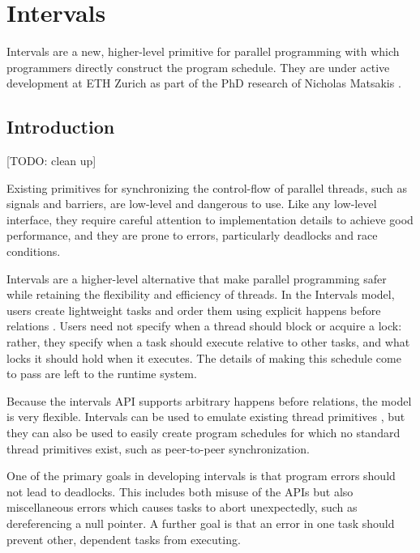 
\chapter{Intervals}
\label{cha:intervals}

Intervals \cite{Matsakis2009a} are a new, higher-level primitive for
parallel programming with which programmers directly construct the
program schedule. They are under active development at ETH Zurich as
part of the PhD research of Nicholas Matsakis \cite{Matsakis2010}.

\section{Introduction}
\label{sec:intervals-introduction}

[TODO: clean up]

Existing primitives for synchronizing the control-flow of parallel
threads, such as signals and barriers, are low-level and dangerous to
use. Like any low-level interface, they require careful attention to
implementation details to achieve good performance, and they are prone
to errors, particularly deadlocks and race conditions.

Intervals are a higher-level alternative that make parallel
programming safer while retaining the flexibility and efficiency of
threads. In the Intervals model, users create lightweight tasks and
order them using explicit happens before relations
\cite{Lamport1978}. Users need not specify when a thread should block
or acquire a lock: rather, they specify when a task should execute
relative to other tasks, and what locks it should hold when it
executes. The details of making this schedule come to pass are left to
the runtime system.

Because the intervals API supports arbitrary happens before relations,
the model is very flexible. Intervals can be used to emulate existing
thread primitives \cite{Matsakis2009a}, but they can also be used to
easily create program schedules for which no standard thread
primitives exist, such as peer-to-peer synchronization.

One of the primary goals in developing intervals is that program
errors should not lead to deadlocks. This includes both misuse of the
APIs but also miscellaneous errors which causes tasks to abort
unexpectedly, such as dereferencing a null pointer. A further goal is
that an error in one task should prevent other, dependent tasks from
executing.


